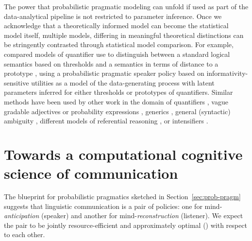 \documentclass[fleqn,reqno,12pt]{article}
\newcommand{\real}{\acro{real}}
\begin{document}
The power that probabilistic pragmatic modeling can unfold if used as part of the data-analytical pipeline is not restricted to parameter inference.
Once we acknowledge that a theoretically informed model can become the statistical model itself, multiple models, differing in meaningful theoretical distinctions can be stringently contrasted through statistical model comparison.
For example, \citet{Tielvan-TielFranke2021:Probabilistic-p} compared models of quantifier use to distinguish between a standard logical semantics based on thresholds \citep{BarwiseCooper1981:Generalized-Qua} and a semantics in terms of distance to a prototype \citep{McCloskeyGlucksberg1978:Natural-Categor}, using a probabilistic pragmatic speaker policy based on informativity-sensitive utilities as a model of the data-generating process with latent parameters inferred for either thresholds or prototypes of quantifiers.
Similar methods have been used by other work in the domain of quantifiers \citep[][]{CarcassiSzymanik2021:An-alternatives,ReeseJasbi2026:Resolving-the-V,TielFranke2026:Bespoke-Probabi},
vague gradable adjectives or probability expressions \citep{Cremers2022:A-Rational-Spee,van-TielFranke2022:Meaning-and-use-probability},
generics \citep{Tessler2019:The-Language-of},
general (syntactic) ambiguity \citep{FrankeBergen2020:Theory-driven-s},
different models of referential reasoning \citep{QingFranke2013:Variations-on-a,FrankeDegen2015:Reasoning-in-Re},
or intensifiers \citep{SchollerFranke2017:Surprisingly:-M,Zhao2019:Interpreting-In}.



\section{Towards a computational cognitive science of communication}
\label{sec:towards-cogn-turn}

The blueprint for probabilistic pragmatics sketched in Section~\ref{sec:prob-pragm} suggests that linguistic communication is a pair of policies: one for mind-\emph{anticipation} (speaker) and another for mind-\emph{reconstruction} (listener).
We expect the pair to be jointly resource-efficient and approximately optimal (\real) with respect to each other.
\end{document}
